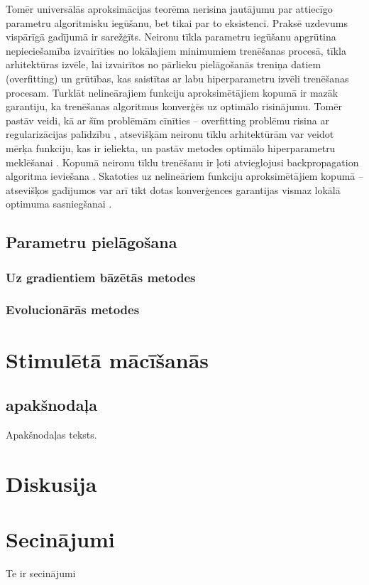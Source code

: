 \documentclass{ludis} %
\begin{document}
Tomēr universālās aproksimācijas teorēma nerisina jautājumu par attiecīgo parametru algoritmisku iegūšanu, bet tikai par to eksistenci.
Praksē uzdevums vispārīgā gadījumā ir sarežģīts.
Neironu tīkla parametru iegūšanu apgrūtina nepieciešamība izvairīties no lokālajiem minimumiem trenēšanas procesā, tīkla arhitektūras izvēle, lai izvairītos no pārlieku pielāgošanās treniņa datiem (overfitting) un grūtības, kas saistītas ar labu hiperparametru izvēli trenēšanas procesam.
Turklāt nelineārajiem funkciju aproksimētājiem kopumā ir mazāk garantiju, ka trenēšanas algoritmus konverģēs uz optimālo risinājumu.
Tomēr pastāv veidi, kā ar šīm problēmām cīnīties -- overfitting problēmu risina ar regularizācijas palīdzību \autocite{sarle1995stopped} \autocite{srivastava2014dropout}, atsevišķām neironu tīklu arhitektūrām var veidot mērķa funkciju, kas ir ieliekta, un pastāv metodes optimālo hiperparametru meklēšanai \autocite{bergstra2011algorithms}.
Kopumā neironu tīklu trenēšanu ir ļoti atvieglojusi backpropagation algoritma ieviešana \autocite{Werbos74} \autocite{Rumelhart1988}.
Skatoties uz nelineāriem funkciju aproksimētājiem kopumā -- atsevišķos gadījumos var arī tikt dotas konverģences garantijas vismaz lokālā optimuma sasniegšanai \autocite{bhatnagar2009convergent}.

\section{Parametru pielāgošana}
\subsection{Uz gradientiem bāzētās metodes}
\subsection{Evolucionārās metodes}

\chapter{Stimulētā mācīšanās} \label{chap:stim}
\section{apakšnodaļa}
Apakšnodaļas teksts.

\chapter{Diskusija}
\chapter{Secinājumi}
Te ir secinājumi

\printbibliography
\end{document}

